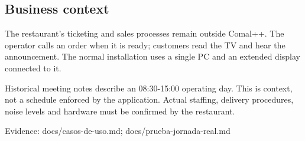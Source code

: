 \subsection{Business context}

The restaurant's ticketing and sales processes remain outside Comal++. The operator calls an order when it is ready; customers read the TV and hear the announcement. The normal installation uses a single PC and an extended display connected to it.

Historical meeting notes describe an 08:30-15:00 operating day. This is context, not a schedule enforced by the application. Actual staffing, delivery procedures, noise levels and hardware must be confirmed by the restaurant.

Evidence: docs/casos-de-uso.md; docs/prueba-jornada-real.md
